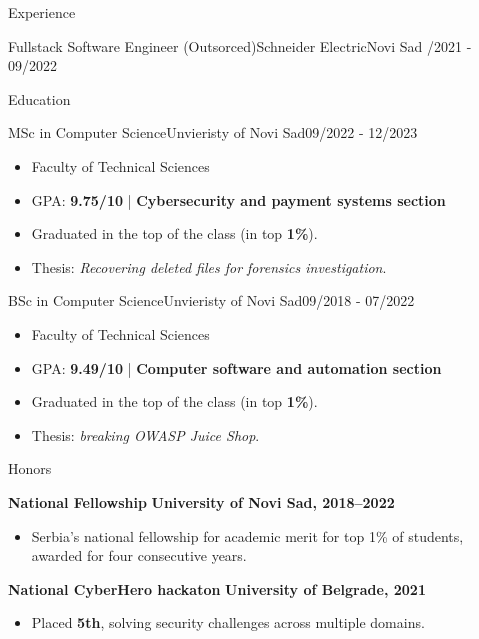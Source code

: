 \documentclass[]{mcdowellcv}
\begin{document}
\begin{cvsection}{Experience}
\begin{cvsubsection}{Fullstack Software Engineer (Outsorced)}{Schneider Electric}{Novi Sad /2021 - 09/2022}
    \end{cvsubsection}

\end{cvsection}
 
    \begin{cvsection}{Education}
        \begin{cvsubsection}{MSc in Computer Science}{Unvieristy of Novi Sad}{09/2022 - 12/2023}
            \begin{itemize}
                \item Faculty of Technical Sciences
                \item GPA: \textbf{9.75/10} | \textbf{Cybersecurity and payment systems section}
                \item Graduated in the top of the class (in top \textbf{1\%}).
                \item Thesis: \textit{Recovering deleted files for forensics investigation}.
            \end{itemize}
        \end{cvsubsection}
        \begin{cvsubsection}{BSc in Computer Science}{Unvieristy of Novi Sad}{09/2018 - 07/2022}
            \begin{itemize}
                \item Faculty of Technical Sciences
                \item GPA: \textbf{9.49/10} | \textbf{Computer software and automation section}
                \item Graduated in the top of the class (in top \textbf{1\%}).
                \item Thesis: \textit{breaking OWASP Juice Shop}.
            \end{itemize}
        \end{cvsubsection}
    \end{cvsection}

    \begin{cvsection}{Honors}
        \begin{cvsubsection}{}{}{}    
            \textbf{National Fellowship} \hfill \textbf{University of Novi Sad, 2018--2022}
            \begin{itemize}[label=\circ]
                \item \small{Serbia's national fellowship for academic merit for top 1\% of students, awarded for four consecutive years.}
            \end{itemize}
        \end{cvsubsection}
        \begin{cvsubsection}{}{}{}    
            \textbf{National CyberHero hackaton} \hfill \textbf{University of Belgrade, 2021}
            \begin{itemize}[label=\circ]
                \item \small{Placed \textbf{5th}, solving security challenges across multiple domains.}
            \end{itemize}
        \end{cvsubsection}
    \end{cvsection}
\end{document}
